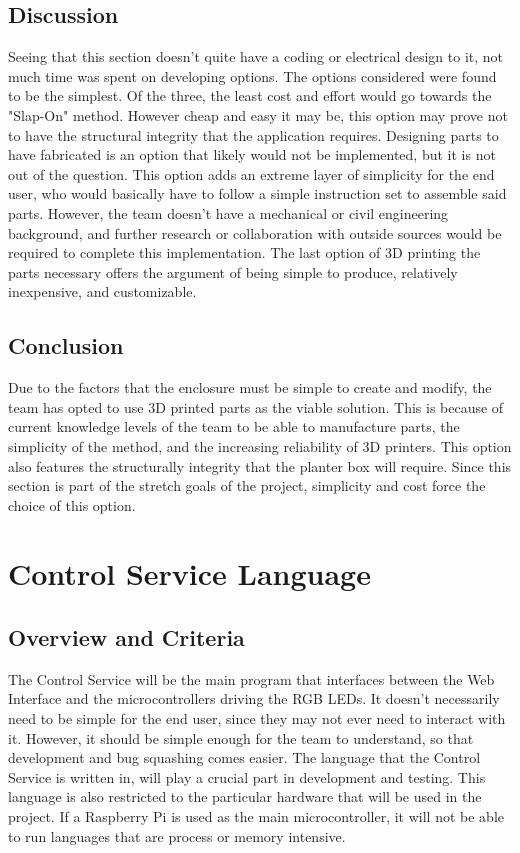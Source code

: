	\subsection{Discussion}
	Seeing that this section doesn't quite have a coding or electrical design to it, not much time was spent on developing options.  The options considered were found to be the
	simplest.  Of the three, the least cost and effort would go towards the "Slap-On" method.  However cheap and easy it may be, this option may prove not to have the structural
	integrity that the application requires.  Designing parts to have fabricated is an option that likely would not be implemented, but it is not out of the question.  This option
	adds an extreme layer of simplicity for the end user, who would basically have to follow a simple instruction set to assemble said parts.  However, the team doesn't have a
	mechanical or civil engineering background, and further research or collaboration with outside sources would be required to complete this implementation.  The last option of
	3D printing the parts necessary offers the argument of being simple to produce, relatively inexpensive, and customizable.

	\subsection{Conclusion}
	Due to the factors that the enclosure must be simple to create and modify, the team has opted to use 3D printed parts as the viable solution.  This is because of current knowledge
	levels of the team to be able to manufacture parts, the simplicity of the method, and the increasing reliability of 3D printers.  This option also features the structurally integrity
	that the planter box will require.  Since this section is part of the stretch goals of the project, simplicity and cost force the choice of this option.

	\newpage %

	\section{Control Service Language}

		\subsection{Overview and Criteria}
		The Control Service will be the main program that interfaces between the Web Interface and the microcontrollers driving the RGB LEDs.  It doesn't necessarily need to be simple
		for the end user, since they may not ever need to interact with it.  However, it should be simple enough for the team to understand, so that development and bug squashing comes
		easier.  The language that the Control Service is written in, will play a crucial part in development and testing.  This language is also restricted to the particular hardware
		that will be used in the project.  If a Raspberry Pi is used as the main microcontroller, it will not be able to run languages that are process or memory intensive.

